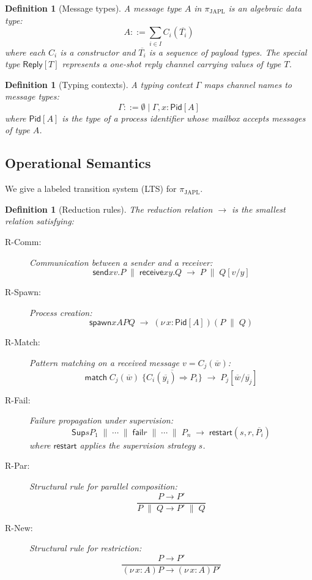 \documentclass[11pt,a4paper]{article}
\newtheorem{definition}[theorem]{Definition}
\newcommand{\ppar}{\;\|\;}
\newcommand{\pnew}[1]{(\nu\, #1)}
\newcommand{\Pid}{\mathsf{Pid}}
\newcommand{\Sup}{\mathsf{Sup}}
\newcommand{\spawn}{\mathsf{spawn}}
\newcommand{\sendf}{\mathsf{send}}
\newcommand{\recvf}{\mathsf{receive}}
\newcommand{\failf}{\mathsf{fail}}
\begin{document}
\begin{definition}[Message types]\label{def:msgtypes}
A message type $A$ in $\pi_{\text{JAPL}}$ is an algebraic data type:
\[
A ::= \sum_{i \in I} C_i(\overline{T_i})
\]
where each $C_i$ is a constructor and $\overline{T_i}$ is a sequence of payload types. The special type $\mathsf{Reply}[T]$ represents a one-shot reply channel carrying values of type $T$.
\end{definition}

\begin{definition}[Typing contexts]\label{def:typing}
A typing context $\Gamma$ maps channel names to message types:
\[
\Gamma ::= \emptyset \mid \Gamma, x : \Pid[A]
\]
where $\Pid[A]$ is the type of a process identifier whose mailbox accepts messages of type $A$.
\end{definition}

\subsection{Operational Semantics}

We give a labeled transition system (LTS) for $\pi_{\text{JAPL}}$.

\begin{definition}[Reduction rules]\label{def:reduction}
The reduction relation $\rightarrow$ is the smallest relation satisfying:

\begin{description}
\item[R-Comm:] Communication between a sender and a receiver:
\[
\sendf{x}{v}.P \ppar \recvf{x}{y}.Q \;\rightarrow\; P \ppar Q[v/y]
\]

\item[R-Spawn:] Process creation:
\[
\spawn{x}{A}{P}{Q} \;\rightarrow\; \pnew{x : \Pid[A]}(P \ppar Q)
\]

\item[R-Match:] Pattern matching on a received message $v = C_j(\overline{w})$:
\[
\mathsf{match}\; C_j(\overline{w})\; \{\overline{C_i(\overline{y_i}) \Rightarrow P_i}\} \;\rightarrow\; P_j[\overline{w}/\overline{y_j}]
\]

\item[R-Fail:] Failure propagation under supervision:
\[
\Sup{s}{P_1 \ppar \cdots \ppar \failf{r} \ppar \cdots \ppar P_n} \;\rightarrow\; \mathsf{restart}(s, r, \overline{P_i})
\]
where $\mathsf{restart}$ applies the supervision strategy $s$.

\item[R-Par:] Structural rule for parallel composition:
\[
\frac{P \rightarrow P'}{P \ppar Q \rightarrow P' \ppar Q}
\]

\item[R-New:] Structural rule for restriction:
\[
\frac{P \rightarrow P'}{\pnew{x:A} P \rightarrow \pnew{x:A} P'}
\]
\end{description}
\end{definition}
\end{document}
